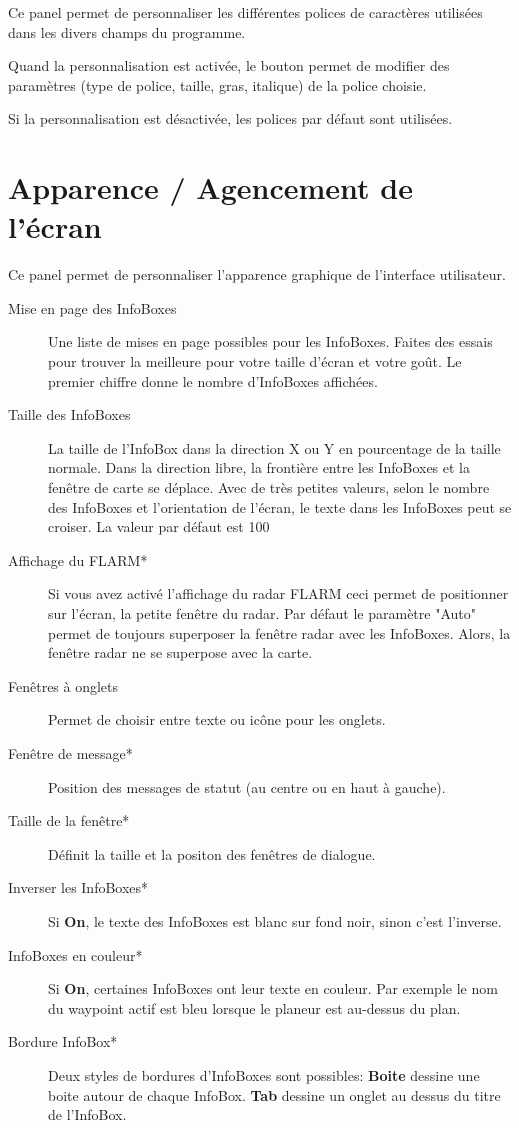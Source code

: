 Ce panel permet de personnaliser les différentes polices de caractères utilisées dans les divers champs du programme.


Quand la personnalisation est activée, le bouton  permet de modifier des paramètres (type de police, taille, gras, italique) de la police choisie.

Si la personnalisation est désactivée, les polices par défaut sont utilisées.

\section{Apparence / Agencement de l'écran}\label{sec:interface-appearance}

Ce panel permet de personnaliser l'apparence graphique de l'interface utilisateur.

\begin{description}
\item[Mise en page des InfoBoxes]  Une liste de mises en page possibles pour les InfoBoxes. Faites des essais pour trouver la meilleure pour votre taille d'écran et votre goût. Le premier chiffre donne le nombre d'InfoBoxes affichées.
\item[Taille des InfoBoxes] 
La taille de l'InfoBox dans la direction X ou Y en pourcentage de la taille normale.
Dans la direction libre, la frontière entre les InfoBoxes et la fenêtre de carte se déplace.
Avec de très petites valeurs, selon le nombre des InfoBoxes et l'orientation de l'écran,
le texte dans les InfoBoxes peut se croiser.
La valeur par défaut est 100%
\item[Affichage du FLARM*]  \label{conf:flarmradar-place}
Si vous avez activé l'affichage du radar FLARM ceci permet de positionner sur l'écran, la petite fenêtre du radar. Par défaut le paramètre "Auto" permet de toujours superposer la fenêtre radar avec les InfoBoxes. Alors, la fenêtre radar ne se superpose avec la carte. 
\item[Fenêtres à onglets]  Permet de choisir entre texte ou icône pour les onglets.
\item[Fenêtre de message*]  Position des messages de statut (au centre ou en haut à gauche).
\item[Taille de la fenêtre*]  Définit la taille et la positon des fenêtres de dialogue.
\item[Inverser les InfoBoxes*]  Si {\bf On}, le texte des InfoBoxes est blanc sur fond noir, sinon c'est l'inverse.
\item[InfoBoxes en couleur*]  Si {\bf On}, certaines InfoBoxes ont leur texte en couleur. Par exemple le nom du waypoint actif est bleu lorsque le planeur est au-dessus du plan.
\item[Bordure InfoBox*]  Deux styles de bordures d'InfoBoxes sont possibles:  {\bf Boite} dessine une boite autour de chaque InfoBox. {\bf Tab} dessine un onglet au dessus du titre de l'InfoBox.
\end{description}


